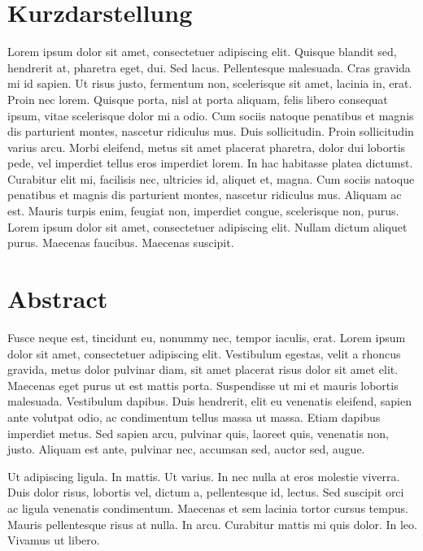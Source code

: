 \thispagestyle{empty}
\section*{Kurzdarstellung}
\label{sec:kurzdarstellung}
Lorem ipsum dolor sit amet, consectetuer adipiscing elit. Quisque blandit sed, hendrerit at, pharetra eget, dui. Sed lacus. Pellentesque malesuada. Cras gravida mi id sapien. Ut risus justo, fermentum non, scelerisque sit amet, lacinia in, erat. Proin nec lorem. Quisque porta, nisl at porta aliquam, felis libero consequat ipsum, vitae scelerisque dolor mi a odio. Cum sociis natoque penatibus et magnis dis parturient montes, nascetur ridiculus mus. Duis sollicitudin. Proin sollicitudin varius arcu. Morbi eleifend, metus sit amet placerat pharetra, dolor dui lobortis pede, vel imperdiet tellus eros imperdiet lorem. In hac habitasse platea dictumst. Curabitur elit mi, facilisis nec, ultricies id, aliquet et, magna. Cum sociis natoque penatibus et magnis dis parturient montes, nascetur ridiculus mus. Aliquam ac est. Mauris turpis enim, feugiat non, imperdiet congue, scelerisque non, purus. Lorem ipsum dolor sit amet, consectetuer adipiscing elit. Nullam dictum aliquet purus. Maecenas faucibus. Maecenas suscipit.


\section*{Abstract}
\label{sec:abstract}
Fusce neque est, tincidunt eu, nonummy nec, tempor iaculis, erat. Lorem ipsum dolor sit amet, consectetuer adipiscing elit. Vestibulum egestas, velit a rhoncus gravida, metus dolor pulvinar diam, sit amet placerat risus dolor sit amet elit. Maecenas eget purus ut est mattis porta. Suspendisse ut mi et mauris lobortis malesuada. Vestibulum dapibus. Duis hendrerit, elit eu venenatis eleifend, sapien ante volutpat odio, ac condimentum tellus massa ut massa. Etiam dapibus imperdiet metus. Sed sapien arcu, pulvinar quis, laoreet quis, venenatis non, justo. Aliquam est ante, pulvinar nec, accumsan sed, auctor sed, augue.

Ut adipiscing ligula. In mattis. Ut varius. In nec nulla at eros molestie viverra. Duis dolor risus, lobortis vel, dictum a, pellentesque id, lectus. Sed suscipit orci ac ligula venenatis condimentum. Maecenas et sem lacinia tortor cursus tempus. Mauris pellentesque risus at nulla. In arcu. Curabitur mattis mi quis dolor. In leo. Vivamus ut libero.
